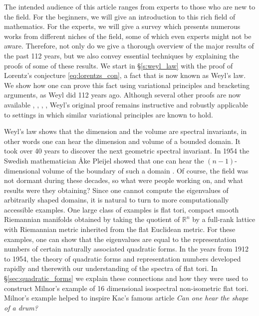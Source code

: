 \documentclass{amsart}
\theoremstyle{definition}
\newcommand*{\R}{\mathbb{R}}
\begin{document}
The intended audience of this article ranges from experts to those who are new to the field. For the beginners, we will give an introduction to this rich field of mathematics. For the experts, we will give a survey which presents numerous works from different niches of the field, some of which even experts might not be aware. Therefore, not only do we give a thorough overview of the major results of the past 112 years, but we also convey essential techniques by explaining the proofs of some of these results. We start in \S \ref{s:weyl_law} with the proof of Lorentz's conjecture \eqref{eq:lorentzs_con}, a fact that is now known as Weyl's law.  We show how one can prove this fact using variational principles and bracketing arguments, as Weyl did 112 years ago.  Although several other proofs are now available \cite{ivrii1981asymptotics}, \cite{ivrii2016100}, \cite{canzani_galkowski2023}, \cite{canzani_galkowski_beams}, Weyl's original proof remains instructive and robustly applicable to settings in which similar variational principles are known to hold. 

Weyl's law shows that the dimension and the volume are spectral invariants, in other words one can hear the dimension and volume of a bounded domain.  It took over 40 years to discover the next geometric spectral invariant.  In 1954 the Swedish mathematician Åke Pleijel showed that one can hear the $(n-1)$-dimensional volume of the boundary of such a domain \cite{pleijel1954study}.  Of course, the field was not dormant during these decades, so what were people working on, and what results were they obtaining?  Since one cannot compute the eigenvalues of arbitrarily shaped domains, it is natural to turn to more computationally accessible examples.  One large class of examples is flat tori, compact smooth Riemannian manifolds obtained by taking the quotient of $\R^n$ by a full-rank lattice with Riemannian metric inherited from the flat Euclidean metric.  For these examples, one can show that the eigenvalues are equal to the representation numbers of certain naturally associated quadratic forms.  In the years from 1912 to 1954, the theory of quadratic forms and representation numbers developed rapidly and therewith our understanding of the spectra of flat tori.  In \S \ref{sec:quadratic_forms} we explain these connections and how they were used to construct Milnor's example of 16 dimensional isospectral non-isometric flat tori.  Milnor's example helped to inspire Kac's famous article \textit{Can one hear the shape of a drum?}

\end{document}
